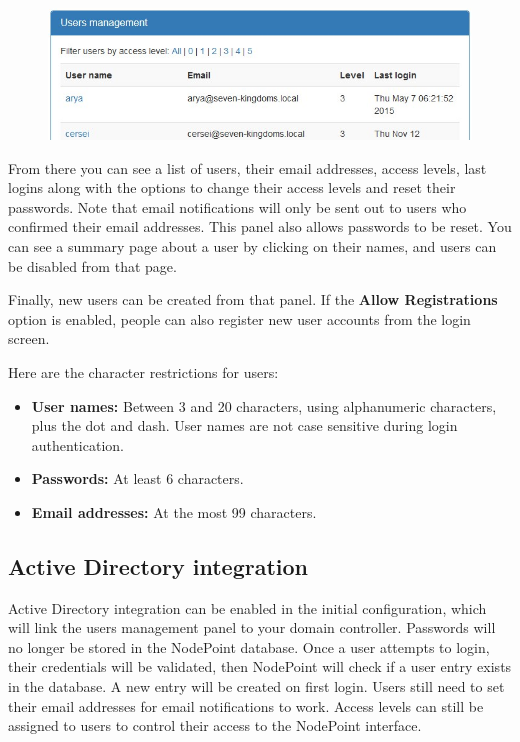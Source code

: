 \documentclass[11pt]{article}
\begin{document}
\begin{figure}[h]
\includegraphics{userman.jpg}
\end{figure}

From there you can see a list of users, their email addresses, access levels, last logins along with the options to change their access levels and reset their passwords. Note that email notifications will only be sent out to users who confirmed their email addresses. This panel also allows passwords to be reset. You can see a summary page about a user by clicking on their names, and users can be disabled from that page.

Finally, new users can be created from that panel. If the \textbf{Allow Registrations} option is enabled, people can also register new user accounts from the login screen.

Here are the character restrictions for users:

\begin{itemize}
\item \textbf{User names:} Between 3 and 20 characters, using alphanumeric characters, plus the dot and dash. User names are not case sensitive during login authentication.
\item \textbf{Passwords:} At least 6 characters.
\item \textbf{Email addresses:} At the most 99 characters.
\end{itemize}

\subsection{Active Directory integration}
Active Directory integration can be enabled in the initial configuration, which will link the users management panel to your domain controller. Passwords will no longer be stored in the NodePoint database. Once a user attempts to login, their credentials will be validated, then NodePoint will check if a user entry exists in the database. A new entry will be created on first login. Users still need to set their email addresses for email notifications to work. Access levels can still be assigned to users to control their access to the NodePoint interface.
\end{document}
